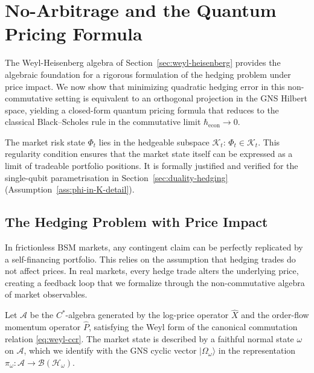 
\section{No-Arbitrage and the Quantum Pricing Formula}\label{sec:no-arbitrage}

The Weyl-Heisenberg algebra of Section~\ref{sec:weyl-heisenberg} provides the
algebraic foundation for a rigorous formulation of the hedging problem under price
impact. We now show that minimizing quadratic hedging error in this non-commutative
setting is equivalent to an orthogonal projection in the GNS Hilbert space, yielding
a closed-form quantum pricing formula that reduces to the classical Black--Scholes
rule in the commutative limit $\hbar_{\mathrm{econ}} \to 0$.

\begin{assumption}\label{ass:phi-in-K}
The market risk state $\Phi_t$ lies in the hedgeable subspace $\mathcal{K}_t$:
$\Phi_t \in \mathcal{K}_t$. This regularity condition ensures that the
market state itself can be expressed as a limit of tradeable portfolio positions.
It is formally justified and verified for the single-qubit parametrisation
in Section~\ref{sec:duality-hedging} (Assumption~\ref{ass:phi-in-K-detail}).
\end{assumption}

\subsection{The Hedging Problem with Price Impact}

In frictionless BSM markets, any contingent claim can be perfectly replicated by a
self-financing portfolio. This relies on the assumption that hedging trades do not
affect prices. In real markets, every hedge trade alters the underlying price,
creating a feedback loop that we formalize through the non-commutative algebra of
market observables.

Let $\mathcal{A}$ be the $C^*$-algebra generated by the log-price operator $\hat{X}$
and the order-flow momentum operator $\hat{P}$, satisfying the Weyl form of the
canonical commutation relation \eqref{eq:weyl-ccr}. The market state is described by
a faithful normal state $\omega$ on $\mathcal{A}$, which we identify with the GNS
cyclic vector $|\Omega_\omega\rangle$ in the representation
$\pi_\omega : \mathcal{A} \to \mathcal{B}(\mathcal{H}_\omega)$.

